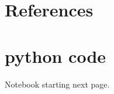 \documentclass{article}
\begin{document}
\section{References}



\section{python code}
Notebook starting next page.

%
\end{document}
